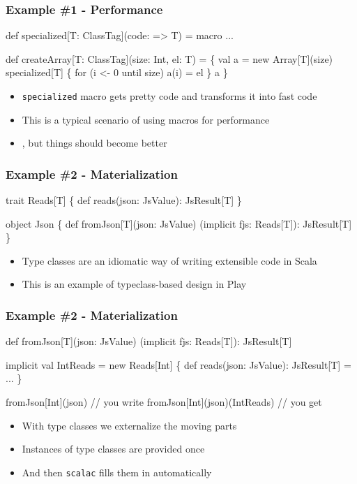 \documentclass[svgnames,hyperref={bookmarks=false}]{beamer}
\begin{document}
\begin{frame}[fragile]
\frametitle{Example \#1 - Performance}

\begin{semiverbatim}
\alert{def specialized[T: ClassTag](code: => T) = macro ...}

def createArray[T: ClassTag](size: Int, el: T) = \{
  val a = new Array[T](size)
  \alert{specialized[T] \{}
    for (i <- 0 until size) a(i) = el
  \alert{\}}
  a
\}
\end{semiverbatim}

\begin{itemize}
\item \texttt{specialized} macro gets pretty code and transforms it into fast code
\item This is a typical scenario of using macros for performance
\item {}, but things should become better
\end{itemize}
\end{frame}

\begin{frame}[fragile]
\frametitle{Example \#2 - Materialization}

\begin{semiverbatim}
trait Reads[T] \{
  def reads(json: JsValue): JsResult[T]
\}

object Json \{
  def fromJson[T](json: JsValue)
    (implicit fjs: Reads[T]): JsResult[T]
\}

\end{semiverbatim}

\begin{itemize}
\item Type classes are an idiomatic way of writing extensible code in Scala
\item This is an example of typeclass-based design in Play
\end{itemize}
\end{frame}

\begin{frame}[fragile]
\frametitle{Example \#2 - Materialization}

\begin{semiverbatim}
def fromJson[T](json: JsValue)
  (implicit fjs: Reads[T]): JsResult[T]

implicit val IntReads = new Reads[Int] \{
  def reads(json: JsValue): JsResult[T] = ...
\}

fromJson[Int](json) // you write
fromJson[Int](json)(IntReads) // you get

\end{semiverbatim}

\begin{itemize}
\item With type classes we externalize the moving parts
\item Instances of type classes are provided once
\item And then \texttt{scalac} fills them in automatically
\end{itemize}
\end{frame}
\end{document}
